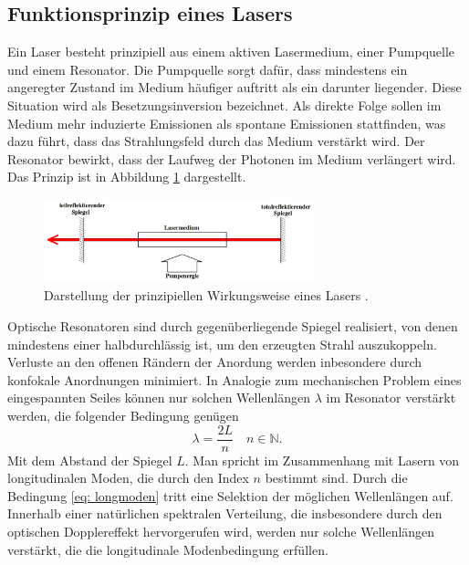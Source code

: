\subsection{Funktionsprinzip eines Lasers}
Ein Laser besteht prinzipiell aus einem aktiven Lasermedium, einer Pumpquelle und einem Resonator. Die Pumpquelle sorgt dafür, dass
mindestens ein angeregter Zustand im Medium häufiger auftritt als ein darunter liegender. Diese Situation wird als Besetzungsinversion bezeichnet. Als direkte
Folge sollen im Medium mehr induzierte Emissionen als spontane Emissionen stattfinden, was dazu führt, dass das Strahlungsfeld durch das Medium verstärkt wird.
Der Resonator bewirkt, dass der Laufweg der Photonen im Medium verlängert wird. Das Prinzip ist in Abbildung \ref{fig: prinzip_laser} dargestellt.
\begin{figure}
  \centering
  \includegraphics[width = 0.7\textwidth]{theorie_bilder/prinzip_laser.png}
  \caption{Darstellung der prinzipiellen Wirkungsweise eines Lasers \cite{anleitung61}.}
  \label{fig: prinzip_laser}
\end{figure}

Optische Resonatoren sind durch gegenüberliegende Spiegel realisiert, von denen mindestens einer halbdurchlässig ist, um den erzeugten Strahl
auszukoppeln. Verluste an den offenen Rändern der Anordung werden inbesondere durch konfokale Anordnungen minimiert.
In Analogie zum mechanischen Problem eines eingespannten Seiles können nur solchen Wellenlängen $\lambda$ im Resonator verstärkt werden, die
folgender Bedingung genügen
\begin{equation}
  \lambda = \frac{2 L }{n} \quad n \in  \mathbb{N}.
  \label{eq: longmoden}
\end{equation}
Mit dem Abstand der Spiegel $L$. Man spricht im Zusammenhang mit Lasern von longitudinalen Moden, die durch den Index $n$ bestimmt sind.
Durch die Bedingung \eqref{eq: longmoden} tritt eine Selektion der möglichen Wellenlängen auf. Innerhalb
einer natürlichen spektralen Verteilung, die insbesondere durch den optischen Dopplereffekt hervorgerufen wird, werden nur solche Wellenlängen
verstärkt, die die longitudinale Modenbedingung erfüllen.

